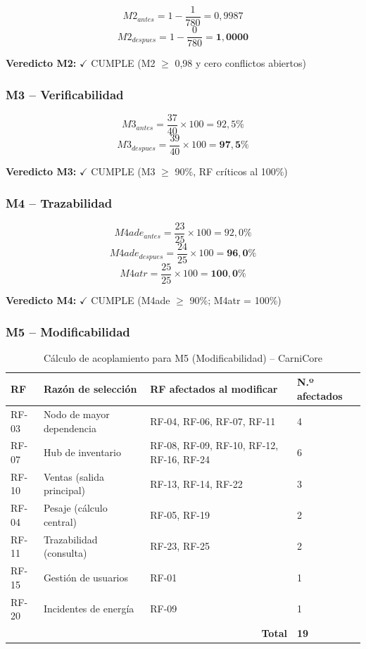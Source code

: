 \documentclass[11pt,a4paper]{article}
\begin{document}
\[ M2_{antes} = 1 - \frac{1}{780} = 0{,}9987 \]
\[ M2_{despues} = 1 - \frac{0}{780} = \mathbf{1{,}0000} \]

\textbf{Veredicto M2:} $\checkmark$ CUMPLE (M2 $\geq$ 0,98 y cero conflictos abiertos)

\subsubsection{M3 -- Verificabilidad}

\[ M3_{antes} = \frac{37}{40} \times 100 = 92{,}5\% \]
\[ M3_{despues} = \frac{39}{40} \times 100 = \mathbf{97{,}5\%} \]

\textbf{Veredicto M3:} $\checkmark$ CUMPLE (M3 $\geq$ 90\%, RF críticos al 100\%)

\subsubsection{M4 -- Trazabilidad}

\[ M4ade_{antes} = \frac{23}{25} \times 100 = 92{,}0\% \]
\[ M4ade_{despues} = \frac{24}{25} \times 100 = \mathbf{96{,}0\%} \]
\[ M4atr = \frac{25}{25} \times 100 = \mathbf{100{,}0\%} \]

\textbf{Veredicto M4:} $\checkmark$ CUMPLE (M4ade $\geq$ 90\%; M4atr = 100\%)

\subsubsection{M5 -- Modificabilidad}

\begin{table}[H]
\centering
\begin{tabular}{|p{1.5cm}|p{5cm}|p{3cm}|p{3cm}|}
\hline
\textbf{RF} & \textbf{Razón de selección} & \textbf{RF afectados al modificar} & \textbf{N.º afectados} \\
\hline
RF-03 & Nodo de mayor dependencia & RF-04, RF-06, RF-07, RF-11 & 4 \\
RF-07 & Hub de inventario & RF-08, RF-09, RF-10, RF-12, RF-16, RF-24 & 6 \\
RF-10 & Ventas (salida principal) & RF-13, RF-14, RF-22 & 3 \\
RF-04 & Pesaje (cálculo central) & RF-05, RF-19 & 2 \\
RF-11 & Trazabilidad (consulta) & RF-23, RF-25 & 2 \\
RF-15 & Gestión de usuarios & RF-01 & 1 \\
RF-20 & Incidentes de energía & RF-09 & 1 \\
\hline
\multicolumn{3}{|r|}{\textbf{Total}} & \textbf{19} \\
\hline
\end{tabular}
\caption{Cálculo de acoplamiento para M5 (Modificabilidad) -- CarniCore}
\label{tab:m5}
\end{table}
\end{document}
